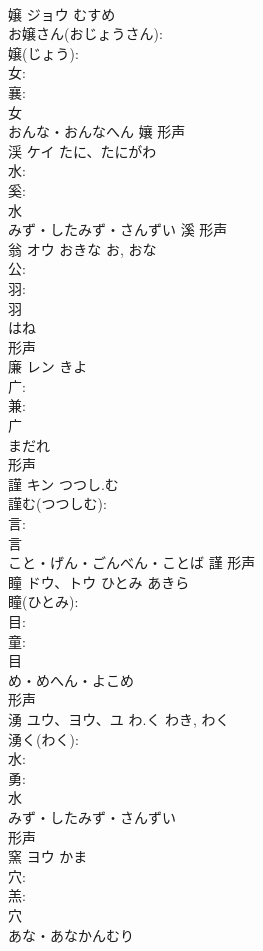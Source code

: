 \documentclass[8pt]{extreport}
\begin{document}
\begin{CJK}{UTF8}{min}
\\	嬢	ジョウ	むすめ		
\\	お嬢さん(おじょうさん): 
\\	嬢(じょう): 
\\	女: 
\\	襄: 
\\	女	
\\	おんな・おんなへん	孃	形声 
\\	渓	ケイ	たに、たにがわ		
\\	水: 
\\	奚: 
\\	水	
\\	みず・したみず・さんずい	溪	形声 
\\	翁	オウ	おきな	お, おな	
\\	公: 
\\	羽: 
\\	羽	
\\	はね	
\\	形声 
\\	廉	レン		きよ	
\\	广: 
\\	兼: 
\\	广	
\\	まだれ	
\\	形声 
\\	謹	キン	つつし.む		
\\	謹む(つつしむ): 
\\	言: 
\\	言	
\\	こと・げん・ごんべん・ことば	謹	形声 
\\	瞳	ドウ、トウ	ひとみ	あきら	
\\	瞳(ひとみ): 
\\	目: 
\\	童: 
\\	目	
\\	め・めへん・よこめ	
\\	形声 
\\	湧	ユウ、ヨウ、ユ	わ.く	わき, わく	
\\	湧く(わく): 
\\	水: 
\\	勇: 
\\	水	
\\	みず・したみず・さんずい	
\\	形声 
\\	窯	ヨウ	かま		
\\	穴: 
\\	羔: 
\\	穴	
\\	あな・あなかんむり	

\end{CJK}
\end{document}

